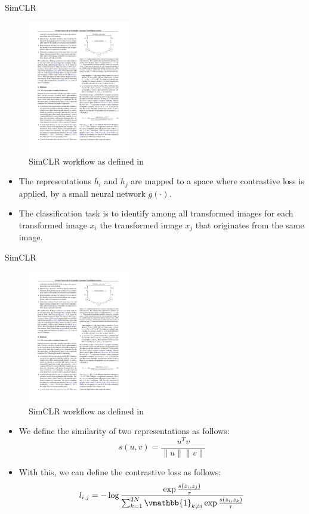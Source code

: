 \documentclass[xcolor=pdftex,dvipsnames,table]{beamer}
\begin{document}
\begin{frame}{SimCLR \cite{Chen2020}}
\begin{figure}[htb]
   \centering
   \includegraphics[width=0.4\textwidth]{../graphics/sim_clr.pdf}
   \caption{SimCLR workflow as defined in \cite{Chen2020}}
\end{figure}
\begin{itemize}
\item The representations $h_i$ and $h_j$ are mapped to a space where contrastive loss is applied, by a small neural network $g(\cdot)$. 
\item The classification task is to identify among all transformed images for each transformed image $x_i$ the transformed image $x_j$ that originates from the same image. 
\end{itemize}
\end{frame}

\begin{frame}{SimCLR \cite{Chen2020}}
\begin{figure}[htb]
   \centering
   \includegraphics[width=0.4\textwidth]{../graphics/sim_clr.pdf}
   \caption{SimCLR workflow as defined in \cite{Chen2020}}
\end{figure}
\begin{itemize}
\item We define the similarity of two representations as follows:
\begin{equation}
s(u,v) = \frac{u^Tv}{\|u\|\|v\|}
\end{equation}
\item With this, we can define the contrastive loss as follows:
 \begin{equation}
 l_{i,j} = -\log \frac{\exp \frac{s(z_i, z_j)} {\tau}} {\sum_{k=1}^{2N}\vmathbb{1}_{k\neq i}\exp \frac{s(z_i, z_k)}{\tau} } 
\end{equation}
\end{itemize}
\end{frame}
\end{document}
